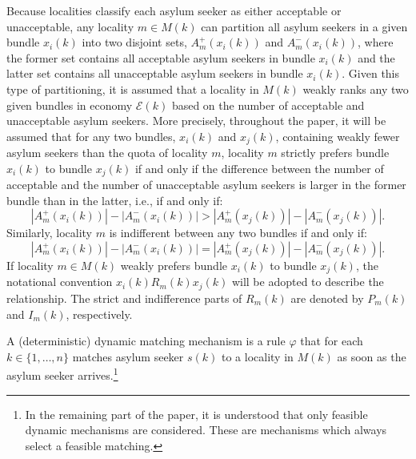 \documentclass[12pt,fleqn]{article}
\begin{document}
Because localities classify each asylum seeker as either acceptable or unacceptable, any locality $m\in M(k)$ can partition all asylum seekers in a given bundle $x_i(k)$ into two disjoint sets, $A^+_m(x_i(k))$ and $A^-_m(x_i(k))$, where the former set contains all acceptable asylum seekers in bundle $x_i(k)$ and the latter set contains all unacceptable asylum seekers in bundle $x_i(k)$. Given this type of partitioning, it is assumed that a locality in $M(k)$ weakly ranks any two given bundles in economy $\mathcal{E}(k)$ based on the number of acceptable and unacceptable asylum seekers. More precisely, throughout the paper, it will be assumed that for any two bundles, $x_i(k)$ and $x_j(k)$, containing weakly fewer asylum seekers than the quota of locality $m$, locality $m$ strictly prefers bundle $x_i(k)$ to bundle $x_j(k)$ if and only if the difference between the number of acceptable and the number of unacceptable asylum seekers is larger in the former bundle than in the latter, i.e., if and only if:
\begin{equation}
|A_m^+(x_i(k))|-|A_m^-(x_i(k))|>|A_m^+(x_j(k))|-|A_m^-(x_j(k))|.\label{EQ:preference}
\end{equation}
\noindent Similarly, locality $m$ is indifferent between any two bundles if and only if:
\begin{equation}
|A_m^+(x_i(k))|-|A_m^-(x_i(k))|=|A_m^+(x_j(k))|-|A_m^-(x_j(k))|.
\end{equation}
\noindent If locality $m\in M(k)$ weakly prefers bundle $x_i(k)$ to bundle $x_j(k)$, the notational convention $x_i(k)R_m(k) x_j(k)$ will be adopted to describe the relationship. The strict and indifference parts of $R_m(k)$ are denoted by $P_m(k)$ and $I_m(k)$, respectively.

A (deterministic) dynamic matching mechanism is a rule $\varphi$ that for each $k\in\{1,\ldots,n\}$ matches asylum seeker $s(k)$ to a locality in $M(k)$ as soon as the asylum seeker arrives.\footnote{In the remaining part of the paper, it is understood that only feasible dynamic mechanisms are considered. These are mechanisms which always select a feasible matching.}
\end{document}
